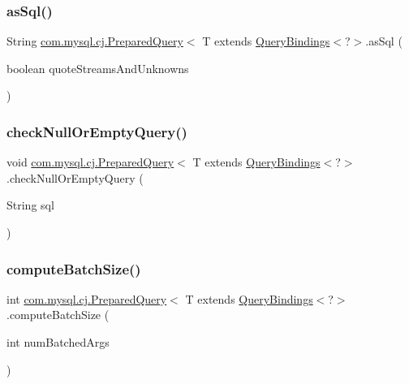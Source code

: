 \subsubsection{\texorpdfstring{as\+Sql()}{asSql()}\hspace{0.1cm}{\footnotesize\ttfamily [2/2]}}
{\footnotesize\ttfamily String \mbox{\hyperlink{interfacecom_1_1mysql_1_1cj_1_1_prepared_query}{com.\+mysql.\+cj.\+Prepared\+Query}}$<$ T extends \mbox{\hyperlink{interfacecom_1_1mysql_1_1cj_1_1_query_bindings}{Query\+Bindings}}$<$?$>$.as\+Sql (\begin{DoxyParamCaption}\item[{boolean}]{quote\+Streams\+And\+Unknowns }\end{DoxyParamCaption})}

\mbox{\label{interfacecom_1_1mysql_1_1cj_1_1_prepared_query_a3d5c1f7649b3caecdfd05e6161d55ee8}} 
\subsubsection{\texorpdfstring{check\+Null\+Or\+Empty\+Query()}{checkNullOrEmptyQuery()}}
{\footnotesize\ttfamily void \mbox{\hyperlink{interfacecom_1_1mysql_1_1cj_1_1_prepared_query}{com.\+mysql.\+cj.\+Prepared\+Query}}$<$ T extends \mbox{\hyperlink{interfacecom_1_1mysql_1_1cj_1_1_query_bindings}{Query\+Bindings}}$<$?$>$.check\+Null\+Or\+Empty\+Query (\begin{DoxyParamCaption}\item[{String}]{sql }\end{DoxyParamCaption})}

\mbox{\label{interfacecom_1_1mysql_1_1cj_1_1_prepared_query_a2f8a64855253f9a463c37617651d8efd}} 
\subsubsection{\texorpdfstring{compute\+Batch\+Size()}{computeBatchSize()}}
{\footnotesize\ttfamily int \mbox{\hyperlink{interfacecom_1_1mysql_1_1cj_1_1_prepared_query}{com.\+mysql.\+cj.\+Prepared\+Query}}$<$ T extends \mbox{\hyperlink{interfacecom_1_1mysql_1_1cj_1_1_query_bindings}{Query\+Bindings}}$<$?$>$.compute\+Batch\+Size (\begin{DoxyParamCaption}\item[{int}]{num\+Batched\+Args }\end{DoxyParamCaption})}

